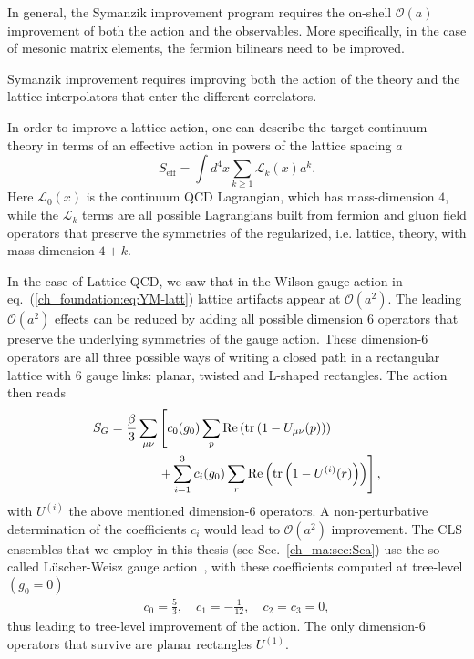 In general, the Symanzik improvement program requires the on-shell $\mathcal{O}(a)$ improvement of both the action and the observables.
More specifically, in the case of mesonic matrix elements, the fermion bilinears need to be improved.

Symanzik improvement requires improving both the action of the theory and the lattice interpolators that enter the different correlators. 

In order to improve a lattice action, one can describe the target continuum theory in terms of an effective action in powers of the lattice spacing $a$
\begin{equation}
S_{\textrm{eff}}=\int d^4x\sum_{k\geq1}\mathcal{L}_k(x)a^{k}.
\end{equation}
Here $\mathcal{L}_0(x)$ is the continuum QCD Lagrangian, which has mass-dimension $4$, while the $\mathcal{L}_k$ terms are all possible Lagrangians built from fermion and gluon field operators that preserve the symmetries of the regularized, i.e. lattice, theory, with mass-dimension $4+k$.

In the case of Lattice QCD, we saw that in the Wilson gauge action in eq.~(\ref{ch_foundation:eq:YM-latt}) lattice artifacts appear at $\mathcal{O}(a^2)$. The leading $\mathcal{O}(a^2)$ effects can be reduced by adding all possible dimension $6$ operators that preserve the underlying symmetries of the gauge action. These dimension-6 operators are all three possible ways of writing a closed path in a rectangular lattice with 6 gauge links: planar, twisted and L-shaped rectangles. The action then reads
\begin{align}
\label{ch_foundation:eq:SG_impr}
S_G=\frac{\beta}{3}\sum_{\mu\nu}&\left[c_0(g_0)\sum_p{\textrm{Re}}\left({\textrm{tr}}\left(1-U_{\mu\nu}(p)\right)\right)\right. \notag \\
&\left.+\sum_{i=1}^3c_i(g_0)\sum_r{\textrm{Re}}\left({\textrm{tr}}\left(1-U^{(i)}(r)\right)\right)\right],
\end{align}
with $U^{(i)}$ the above mentioned dimension-6 operators. A non-perturbative determination of the coefficients $c_i$ would lead to $\mathcal{O}(a^2)$ improvement. The CLS ensembles that we employ in this thesis (see Sec.~\ref{ch_ma:sec:Sea}) use the so called Lüscher-Weisz gauge action~\citep{Luscher:1984xn,Luscher:1985zq}, with these coefficients computed at tree-level $(g_0=0)$
\begin{gather}
\label{ch_foundation:eq:LW}
c_0=\frac{5}{3}, \quad
c_1=-\frac{1}{12}, \quad
c_2=c_3=0,
\end{gather}
thus leading to tree-level improvement of the action. The only dimension-6 operators that survive are planar rectangles $U^{(1)}$.

